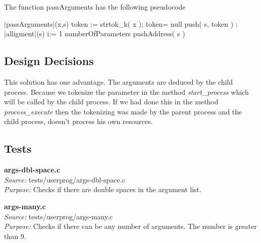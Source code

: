 {	  The function passArguments has the following pseudocode


    \begin{program}
    \BEGIN %
    \PROC |passArguments|(x,s) \BODY
              \DO
		token := strtok\_k( x );
		\IF token= null 
		  \THEN \EXIT 
		  \ELSE push( s, token )   
		\FI;
	      \OD
	      |alligment|(s)
              \FOR i:= 1 \TO numberOfParameters  \DO
		pushAddress( s ) \OD
     \ENDPROC
    \END
    \end{program}


    \subsection{Design Decisions}

	This solution has one advantage. The arguments are deduced by the child process. Because we tokenize the parameter in the method \textit{start\_process} which will be called by the child process. If we had done this in the method \textit{process\_execute} then the tokenizing was made by the parent process and the child process, doesn't process his own resources.

    \subsection{Tests}


      \textbf{args-dbl-space.c}\\
      \textit{Source:} tests/userprog/args-dbl-space.c\\
      \textit{Purpose:} Checks if there are double spaces 
	  in the argument list.


      \textbf{args-many.c}\\
      \textit{Source:} tests/userprog/args-many.c\\
      \textit{Purpose:} Checks if there can be any number of arguments. 
	  The number is greater than 9.

}
